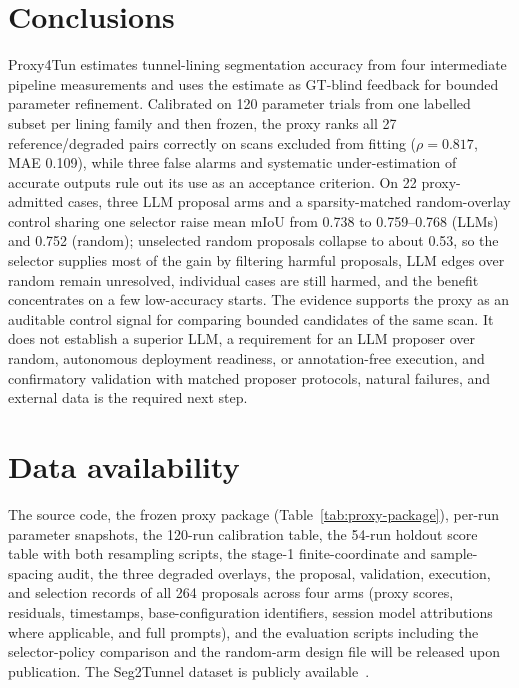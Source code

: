 \documentclass[a4paper,fleqn]{cas-dc}
\begin{document}
\section{Conclusions}\label{sec:conclusions}

Proxy4Tun estimates tunnel-lining segmentation accuracy from four intermediate pipeline measurements and uses the estimate as GT-blind feedback for bounded parameter refinement. Calibrated on 120 parameter trials from one labelled subset per lining family and then frozen, the proxy ranks all 27 reference/degraded pairs correctly on scans excluded from fitting ($\rho=0.817$, MAE 0.109), while three false alarms and systematic under-estimation of accurate outputs rule out its use as an acceptance criterion. On 22 proxy-admitted cases, three LLM proposal arms and a sparsity-matched random-overlay control sharing one selector raise mean mIoU from 0.738 to 0.759--0.768 (LLMs) and 0.752 (random); unselected random proposals collapse to about 0.53, so the selector supplies most of the gain by filtering harmful proposals, LLM edges over random remain unresolved, individual cases are still harmed, and the benefit concentrates on a few low-accuracy starts. The evidence supports the proxy as an auditable control signal for comparing bounded candidates of the same scan. It does not establish a superior LLM, a requirement for an LLM proposer over random, autonomous deployment readiness, or annotation-free execution, and confirmatory validation with matched proposer protocols, natural failures, and external data is the required next step.

\section*{Data availability}

The source code, the frozen proxy package (Table~\ref{tab:proxy-package}), per-run parameter snapshots, the 120-run calibration table, the 54-run holdout score table with both resampling scripts, the stage-1 finite-coordinate and sample-spacing audit, the three degraded overlays, the proposal, validation, execution, and selection records of all 264 proposals across four arms (proxy scores, residuals, timestamps, base-configuration identifiers, session model attributions where applicable, and full prompts), and the evaluation scripts including the selector-policy comparison and the random-arm design file will be released upon publication. The Seg2Tunnel dataset is publicly available~\cite{lin2024seg2tunnel}.
\end{document}
